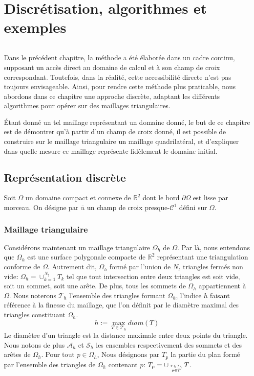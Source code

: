 \chapter{Discrétisation, algorithmes et exemples}
\label{chap:alorithme}
\minitoc

\[\]

Dans le précédent chapitre, la méthode a été élaborée dans un cadre continu, supposant un accès direct au domaine de calcul et à son champ de croix correspondant. Toutefois, dans la réalité, cette accessibilité directe n'est pas toujours envisageable. Ainsi, pour rendre cette méthode plus praticable, nous abordons dans ce chapitre une approche discrète, adaptant les différents algorithmes pour opérer sur des maillages triangulaires.

\'Etant donné un tel maillage représentant un domaine donné, le but de ce chapitre est de démontrer qu'à partir d'un champ de croix donné, il est possible de construire sur le maillage triangulaire un maillage quadrilatéral, et d'expliquer dans quelle mesure ce maillage représente fidèlement le domaine initial.

\section{Représentation discrète}

Soit $\Omega$ un domaine compact et connexe de $\mathbb{R}^2$ dont le bord $\partial\Omega$ est lisse par morceau. On désigne par $\bar{u}$ un champ de croix presque-$\mathcal{C}^1$ défini sur $\Omega$.

\subsection{Maillage triangulaire}

Considérons maintenant un maillage triangulaire $\Omega_h$ de $\Omega$. Par là, nous entendons que $\Omega_h$ est une surface polygonale compacte de $\mathbb{R}^2$ représentant une triangulation conforme de $\Omega$. Autrement dit, $\Omega_h$ formé par l'union de $N_t$ triangles fermés non vide: $\Omega_h=\cup_{k=1}^{N_t}T_k$ tel que tout intersection entre deux triangles est soit vide, soit un sommet, soit une arête. De plus, tous les sommets de $\Omega_h$ appartiennent à $\Omega$. Nous noterons $\mathcal{T}_h$ l'ensemble des triangles formant $\Omega_h$, l'indice $h$ faisant référence à la finesse du maillage, que l’on définit par le diamètre maximal des triangles constituant $\Omega_h$.
$$
h:=\max_{T\in\mathcal{T}_h} diam(T)
$$
Le diamètre d’un triangle est la distance maximale entre deux points du triangle. Nous notons de plus $\mathcal{A}_h$ et $\mathcal{S}_h$ les ensembles respectivement des sommets et des arêtes de $\Omega_h$. Pour tout $p\in\Omega_h$, Nous désignons par $T_p$ la partie du plan formé par l'ensemble des triangles de $\Omega_h$ contenant $p$: $T_p=\displaystyle\cup_{T\in\mathcal{T}_h\atop~p\in T~}T$.

